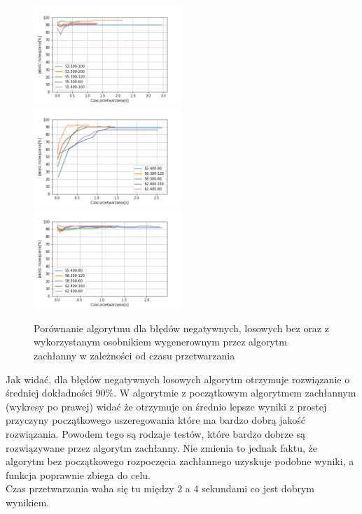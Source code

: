\documentclass{article}
\begin{document}
\begin{figure}[H]
\includegraphics[width=0.5\textwidth]{Czasneg-los-greedy3.png}
\includegraphics[width=0.5\textwidth]{Czasneg-los4.png}
\includegraphics[width=0.5\textwidth]{Czasneg-los-greedy4.png}
\caption{Porównanie algorytmu dla błędów negatywnych, losowych bez oraz z wykorzystanym osobnikiem wygenerownym przez algorytm zachłanny w zależności od czasu przetwarzania}
\end{figure}
Jak widać, dla błędów negatywnych losowych algorytm otrzymuje rozwiązanie o średniej dokładności 90\%. W algorytmie z początkowym algorytmem zachłannym (wykresy po prawej) widać że otrzymuje on średnio lepsze wyniki z prostej przyczyny początkowego uszeregowania które ma bardzo dobrą jakość rozwiązania. Powodem tego są rodzaje testów, które bardzo dobrze są rozwiązywane przez algorytm zachłanny. Nie zmienia to jednak faktu, że algorytm bez początkowego rozpoczęcia zachłannego uzyskuje podobne wyniki, a funkcja poprawnie zbiega do celu. \\
Czas przetwarzania waha się tu między 2 a 4 sekundami co jest dobrym wynikiem.
\end{document}
